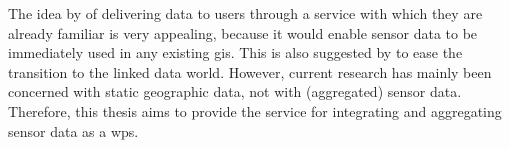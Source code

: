 The idea by \cite{SW:Jones} of delivering data to users through a service with which they are already familiar is very appealing, because it would enable sensor data to be immediately used in any existing \ac{gis}. This is also suggested by \cite{SSW:Atkinson} to ease the transition to the linked data world. However, current research has mainly been concerned with static geographic data, not with (aggregated) sensor data. Therefore, this thesis aims to provide the service for integrating and aggregating sensor data as a \ac{wps}.
